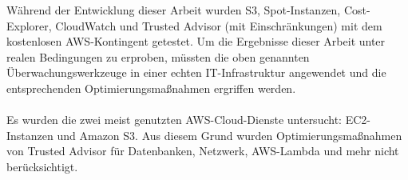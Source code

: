 Während der Entwicklung dieser Arbeit wurden S3, Spot-Instanzen, Cost-Explorer, CloudWatch und Trusted Advisor (mit Einschränkungen) mit dem kostenlosen AWS-Kontingent getestet. Um die Ergebnisse dieser Arbeit unter realen Bedingungen zu erproben, müssten die oben genannten Überwachungswerkzeuge in einer echten IT-Infrastruktur angewendet und die entsprechenden Optimierungsmaßnahmen ergriffen werden. %
\\\\
Es wurden die zwei meist genutzten AWS-Cloud-Dienste untersucht: EC2-Instanzen und Amazon S3. Aus diesem Grund wurden Optimierungsmaßnahmen von Trusted Advisor für Datenbanken, Netzwerk, AWS-Lambda und mehr nicht berücksichtigt.
